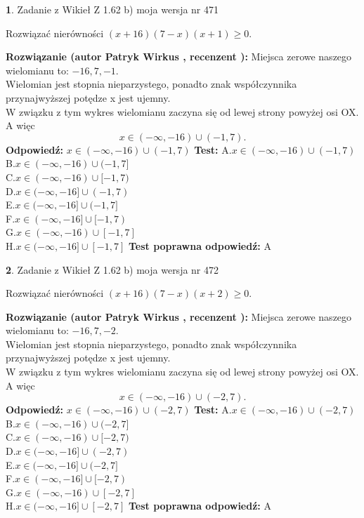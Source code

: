 \documentclass[12pt, a4paper]{article}
\theoremstyle{definition} %
\newtheorem{zad}{}
\newcommand{\zadStart}[1]{\begin{zad}#1\newline}
\newcommand{\zadStop}{\end{zad}}
\newcommand{\rozwStart}[2]{\noindent \textbf{Rozwiązanie (autor #1 , recenzent #2): }\newline}
\newcommand{\rozwStop}{\newline}
\newcommand{\odpStart}{\noindent \textbf{Odpowiedź:}\newline}
\newcommand{\odpStop}{\newline}
\newcommand{\testStart}{\noindent \textbf{Test:}\newline}
\newcommand{\testStop}{\newline}
\newcommand{\kluczStart}{\noindent \textbf{Test poprawna odpowiedź:}\newline}
\newcommand{\kluczStop}{\newline}
\begin{document}
\zadStart{Zadanie z Wikieł Z 1.62 b) moja wersja nr 471}

Rozwiązać nierówności $(x+16)(7-x)(x+1)\ge0$.
\zadStop
\rozwStart{Patryk Wirkus}{}
Miejsca zerowe naszego wielomianu to: $-16, 7, -1$.\\
Wielomian jest stopnia nieparzystego, ponadto znak współczynnika przy\linebreak najwyższej potędze x jest ujemny.\\ W związku z tym wykres wielomianu zaczyna się od lewej strony powyżej osi OX. A więc $$x \in (-\infty,-16) \cup (-1,7).$$
\rozwStop
\odpStart
$x \in (-\infty,-16) \cup (-1,7)$
\odpStop
\testStart
A.$x \in (-\infty,-16) \cup (-1,7)$\\
B.$x \in (-\infty,-16) \cup (-1,7]$\\
C.$x \in (-\infty,-16) \cup [-1,7)$\\
D.$x \in (-\infty,-16] \cup (-1,7)$\\
E.$x \in (-\infty,-16] \cup (-1,7]$\\
F.$x \in (-\infty,-16] \cup [-1,7)$\\
G.$x \in (-\infty,-16) \cup [-1,7]$\\
H.$x \in (-\infty,-16] \cup [-1,7]$
\testStop
\kluczStart
A
\kluczStop



\zadStart{Zadanie z Wikieł Z 1.62 b) moja wersja nr 472}

Rozwiązać nierówności $(x+16)(7-x)(x+2)\ge0$.
\zadStop
\rozwStart{Patryk Wirkus}{}
Miejsca zerowe naszego wielomianu to: $-16, 7, -2$.\\
Wielomian jest stopnia nieparzystego, ponadto znak współczynnika przy\linebreak najwyższej potędze x jest ujemny.\\ W związku z tym wykres wielomianu zaczyna się od lewej strony powyżej osi OX. A więc $$x \in (-\infty,-16) \cup (-2,7).$$
\rozwStop
\odpStart
$x \in (-\infty,-16) \cup (-2,7)$
\odpStop
\testStart
A.$x \in (-\infty,-16) \cup (-2,7)$\\
B.$x \in (-\infty,-16) \cup (-2,7]$\\
C.$x \in (-\infty,-16) \cup [-2,7)$\\
D.$x \in (-\infty,-16] \cup (-2,7)$\\
E.$x \in (-\infty,-16] \cup (-2,7]$\\
F.$x \in (-\infty,-16] \cup [-2,7)$\\
G.$x \in (-\infty,-16) \cup [-2,7]$\\
H.$x \in (-\infty,-16] \cup [-2,7]$
\testStop
\kluczStart
A
\kluczStop
\end{document}

